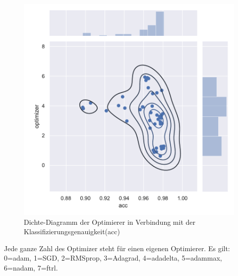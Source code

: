 \begin{figure}[H]
  \centering  
  \includegraphics[scale=0.9]{img/hp_optimizer.pdf}
  \caption{Dichte-Diagramm der Optimierer in Verbindung mit der Klassifizierungsgenauigkeit(acc)}
  \label{fig:hp_Optimierer}
\end{figure}
Jede ganze Zahl des Optimizer steht für einen eigenen Optimierer. Es gilt: 0=adam, 1=SGD, 2=RMSprop, 3=Adagrad, 4=adadelta, 5=adammax, 6=nadam, 7=ftrl.

\newpage

